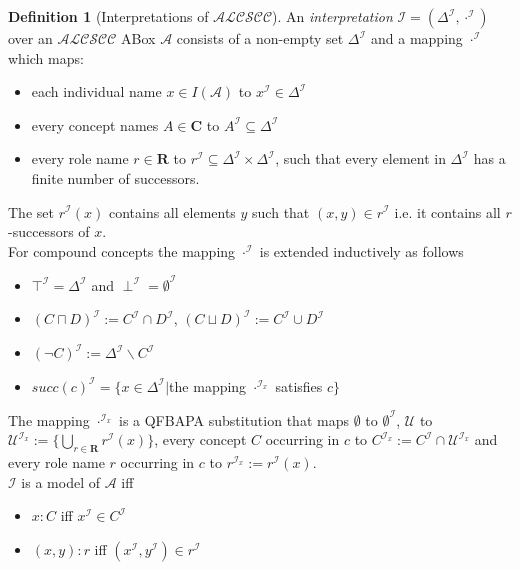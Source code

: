 \documentclass{book}
\theoremstyle{break}
\theoremstyle{definition}
\newtheorem{mydef}{Definition}
\begin{document}
\begin{mydef}[Interpretations of $\mathcal{ALCSCC}$]
An \textit{interpretation} $\mathcal{I}=(\Delta^\mathcal{I},\cdot^\mathcal{I})$ over an $\mathcal{ALCSCC}$ ABox $\mathcal{A}$ consists of a non-empty set $\Delta^\mathcal{I}$ and a mapping $\cdot^\mathcal{I}$ which maps:
\begin{itemize}
\item each individual name $x\in I(\mathcal{A})$ to $x^\mathcal{I}\in \Delta^\mathcal{I}$
\item every concept names $A\in\mathbf{C}$ to $A^\mathcal{I}\subseteq \Delta^\mathcal{I}$
\item every role name $r\in\mathbf{R}$ to $r^\mathcal{I}\subseteq\Delta^\mathcal{I}\times\Delta^\mathcal{I}$, such that every element in $\Delta^\mathcal{I}$ has a finite number of successors.
\end{itemize}
The set $r^\mathcal{I}(x)$ contains all elements $y$ such that $(x,y)\in r^\mathcal{I}$ i.e. it contains all $r$-successors of $x$.\\
For compound concepts the mapping $\cdot^\mathcal{I}$ is extended inductively as follows
\begin{itemize}
\item $\top^\mathcal{I}=\Delta^\mathcal{I}$ and $\perp^\mathcal{I}=\emptyset^\mathcal{I}$
\item $(C\sqcap D)^\mathcal{I}:=C^\mathcal{I}\cap D^\mathcal{I}$, $(C\sqcup D)^\mathcal{I}:=C^\mathcal{I}\cup D^\mathcal{I}$
\item $(\neg C)^\mathcal{I}:=\Delta^\mathcal{I}\backslash C^\mathcal{I}$
\item $succ(c)^\mathcal{I}=\{x\in \Delta^\mathcal{I}|$the mapping $\cdot^{\mathcal{I}_x}$ satisfies $c\}$
\end{itemize}
The mapping $\cdot^{\mathcal{I}_x}$ is a QFBAPA substitution that maps $\emptyset$ to $\emptyset^\mathcal{I}$, $\mathcal{U}$ to $\mathcal{U}^{\mathcal{I}_x}:=\{\bigcup_{r\in\mathbf{R}}r^\mathcal{I}(x)\}$, every concept $C$ occurring in $c$ to $C^{\mathcal{I}_x}:=C^\mathcal{I}\cap \mathcal{U}^{\mathcal{I}_x}$ and every role name $r$ occurring in $c$ to $r^{\mathcal{I}_x}:=r^\mathcal{I}(x)$.\\
$\mathcal{I}$ is a model of $\mathcal{A}$ iff
\begin{itemize}
\item $x:C$ iff $x^\mathcal{I}\in C^\mathcal{I}$ 
\item $(x,y):r$ iff $(x^\mathcal{I},y^\mathcal{I})\in r^\mathcal{I}$
\end{itemize} 
\end{mydef}
\end{document}
